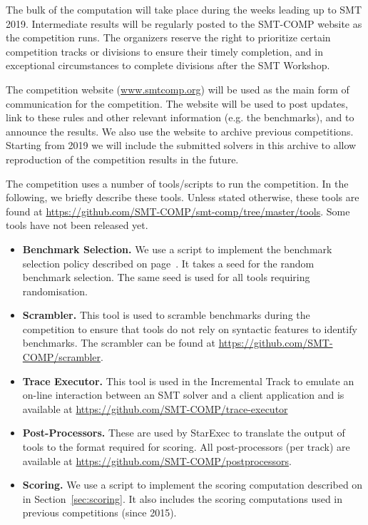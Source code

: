 \documentclass[12pt]{article}
\newcommand{\inctrack}{Incremental Track\xspace}
\begin{document}
%
The bulk of the computation will take place during the weeks leading
up to SMT 2019.  Intermediate results will be regularly posted to the
SMT-COMP website as the competition runs.
%
The organizers reserve the right to prioritize certain competition
tracks or divisions to ensure their timely completion, and in
exceptional circumstances to complete divisions after the SMT
Workshop.


The competition website (\url{www.smtcomp.org}) will be used as the main form
of communication for the competition. The website will be used to post updates,
link to these rules and other relevant information (e.g. the benchmarks), and
to announce the results. We also use the website to archive previous
competitions. Starting from 2019 we will include the submitted solvers in this
archive to allow reproduction of the competition results in the future.
%

 \label{tools}
The competition uses a number of tools/scripts to run the competition. In the
following, we briefly describe these tools. Unless stated otherwise, these
tools are found at \url{https://github.com/SMT-COMP/smt-comp/tree/master/tools}.
{\color{red} Some tools have not been released yet.}
\begin{itemize}
  \item \textbf{Benchmark Selection.} We use a script to implement the
    benchmark selection policy described on page~\pageref{benchmark-selection}.
    It takes a seed for the random benchmark selection. The same seed is used
    for all tools requiring randomisation.
  \item \textbf{Scrambler.} This tool is used to scramble benchmarks during the
    competition to ensure that tools do not rely on syntactic features to
    identify benchmarks. The scrambler can be found at
    \url{https://github.com/SMT-COMP/scrambler}.
  \item \textbf{Trace Executor.} This tool is used in the \inctrack to emulate
    an on-line interaction between an SMT solver and a client application and
    is available at \url{https://github.com/SMT-COMP/trace-executor}
  \item \textbf{Post-Processors.} These are used by StarExec to translate the
    output of tools to the format required for scoring. All post-processors (per
    track) are available at \url{https://github.com/SMT-COMP/postprocessors}.
  \item \textbf{Scoring.} We use a script to implement the scoring computation
    described on in Section~\ref{sec:scoring}. It also includes the scoring
    computations used in previous competitions (since 2015).
\end{itemize}
\end{document}
